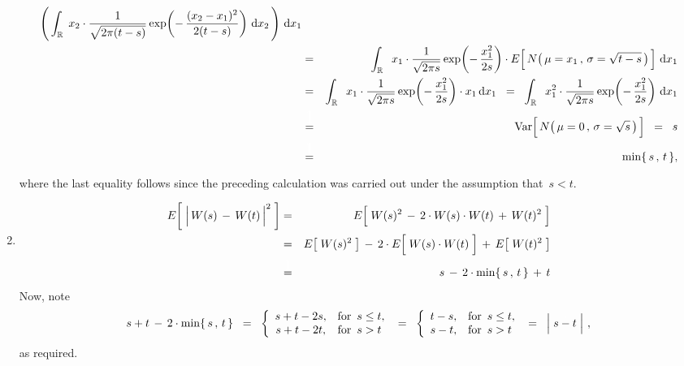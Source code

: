 \begin{enumerate}
\begin{eqnarray*}
			\left(\,\int_{\Re}\;
				 x_{2} 
				\cdot
				\dfrac{1}{\sqrt{2\pi(t-s)}}\exp\!\left(-\,\dfrac{(x_{2}-x_{1})^{2}}{2(t-s)}\right)
				\,\d x_{2}\,\right)
			\,\d x_{1}
	\\
	& = &
		\int_{\Re}\;\;
			x_{1} \cdot
			\dfrac{1}{\sqrt{2\pi s}}\exp\!\left(-\,\dfrac{x_{1}^{2}}{2s}\right)
			\cdot
			E\!\left[\,\overset{{\color{white}.}}{N}\!\left(\,\mu=x_{1}\,,\,\sigma=\sqrt{t-s}\,\right)\,\right]
			\,\d x_{1}
	\\
	& = &
		\int_{\Re}\;\;
			x_{1} \cdot
			\dfrac{1}{\sqrt{2\pi s}}\exp\!\left(-\,\dfrac{x_{1}^{2}}{2s}\right)
			\cdot
			x_{1}
			\,\d x_{1}
	\;\; = \;\;
		\int_{\Re}\;\;
			x_{1}^{2} \cdot
			\dfrac{1}{\sqrt{2\pi s}}\exp\!\left(-\,\dfrac{x_{1}^{2}}{2s}\right)
			\,\d x_{1}
	\\
	& \overset{{\color{white}\textnormal{\LARGE$1$}}}{=} &
		\Var\!\left[\,\overset{{\color{white}.}}{N}\!\left(\,\mu=0\,,\,\sigma=\sqrt{s}\,\right)\,\right]
	\;\; = \;\;
		s
	\\
	& \overset{{\color{white}\textnormal{\Large$1$}}}{=} &
		\min\{\,s\,,\,t\,\},
	\end{eqnarray*}
	where the last equality follows since the preceding calculation
	was carried out under the assumption that \,$s < t$.
\item
	\begin{eqnarray*}
	E\!\left[\;\left\vert\,\overset{{\color{white}.}}{W(s)}\,-\,W(t)\,\right\vert^{2}\;\right]
	& = &
		E\!\left[\;
			W(s)^{2}
			\,-\,
			2 \cdot \overset{{\color{white}.}}{W(s)} \cdot W(t)
			\,+\,
			W(t)^{2}
			\;\right]
	\\
	& = &
		E\!\left[\;W(s)^{2}\;\right]
		\,-\,
		2 \cdot E\!\left[\;\overset{{\color{white}.}}{W(s)} \cdot W(t)\;\right]
		\,+\,
		E\!\left[\;W(t)^{2}\;\right]
	\\
	& \overset{{\color{white}\textnormal{\large$1$}}}{=} &
		s \,-\, 2 \cdot \min\{\,s\,,\,t\,\} \,+\, t
	\end{eqnarray*}
	Now, note
	\begin{equation*}
	s + t \,-\, 2 \cdot \min\{\,s\,,\,t\,\}
	\;\; = \;\;
		\left\{\begin{array}{cl}
			s + t - 2s, & \textnormal{for \,$s \leq t$},
			\\ 
			s + t - 2t, & \textnormal{for \,$s > t$} 
			\end{array}\right.
	\; = \;\;
		\left\{\begin{array}{cl}
			t - s, & \textnormal{for \,$s \leq t$},
			\\ 
			s - t, & \textnormal{for \,$s > t$} 
			\end{array}\right.
	\; = \;\;
		\left\vert\; s \overset{{\color{white}.}}{-} t \;\right\vert\,,
	\end{equation*}
	as required.


\end{enumerate}
